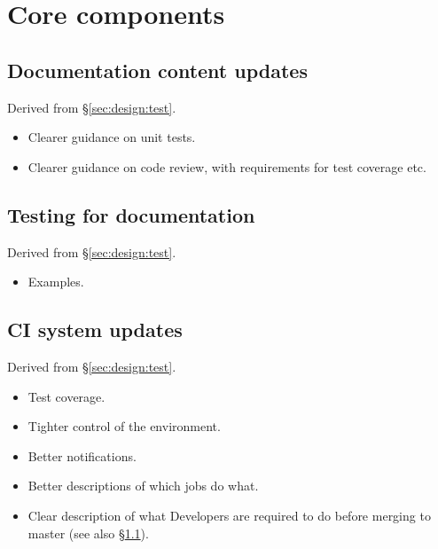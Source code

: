 \section{Core components}
\label{sec:comp}








\subsection{Documentation content updates}
\label{sec:comp:doc}

Derived from \S\ref{sec:design:test}.


\begin{itemize}

  \item{Clearer guidance on unit tests.}
  \item{Clearer guidance on code review, with requirements for test coverage
  etc.}

\end{itemize}

\subsection{Testing for documentation}
\label{sec:comp:doctest}

Derived from \S\ref{sec:design:test}.


\begin{itemize}

  \item{Examples.}

\end{itemize}

\subsection{CI system updates}
\label{sec:comp:ci}

Derived from \S\ref{sec:design:test}.


\begin{itemize}

  \item{Test coverage.}
  \item{Tighter control of the environment.}
  \item{Better notifications.}
  \item{Better descriptions of which jobs do what.}
  \item{Clear description of what Developers are required to do before merging
  to master (see also \S\ref{sec:comp:doc}).}

\end{itemize}






